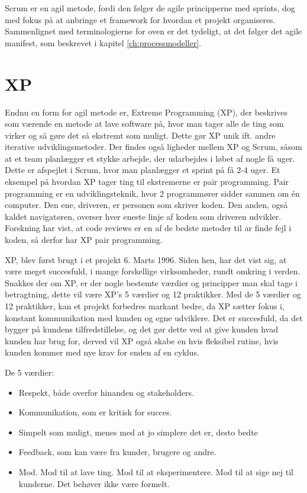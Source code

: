 Scrum er en agil metode, fordi den følger de agile principperne med sprints, dog med fokus på at anbringe et framework for hvordan et projekt organiseres. Sammenlignet med terminologierne for oven er det tydeligt, at det følger det agile manifest, som beskrevet i kapitel \ref{ch:processmodeller}.\cite{Sommerville}  
 

\section{XP}
Endnu en form for agil metode er, Extreme Programming (XP), der beskrives som værende en metode at lave software på, hvor man tager alle de ting som virker og så gøre det så ekstremt som muligt. Dette gør XP unik ift. andre iterative udviklingsmetoder. Der findes også ligheder mellem XP og Scrum, såsom at et team planlægger et stykke arbejde, der udarbejdes i løbet af nogle få uger. Dette er afspejlet i Scrum, hvor man planlægger et sprint på få 2-4 uger. Et eksempel på hvordan XP tager ting til ekstremerne er pair programming. Pair programming er en udviklingsteknik, hvor 2 programmører sidder sammen om én computer. Den ene, driveren, er personen som skriver koden. Den anden, også kaldet navigatøren, overser hver eneste linje af koden som driveren udvikler. Forskning har vist, at code reviews er en af de bedste metoder til ar finde fejl i koden, så derfor har XP pair programming.\cite{WhatisXP}

XP, blev først brugt i et projekt 6. Marts 1996. Siden hen, har det vist sig, at være meget succesfuld, i mange forskellige virksomheder, rundt omkring i verden. Snakkes der om XP, er der nogle bestemte værdier og principper man skal tage i betragtning, dette vil være XP’s 5 værdier og 12 praktikker. Med de 5 værdier og 12 praktikker, kan et projekt forbedres markant bedre, da XP sætter fokus i, konstant kommunikation med kunden og egne udviklere. Det er succesfuld, da det bygger på kundens tilfredstillelse, og det gør dette ved at give kunden hvad kunden har brug for, derved vil XP også skabe en hvis fleksibel rutine, hvis kunden kommer med nye krav for enden af en cyklus. 

De 5 værdier: 

\begin{itemize}
    \item Respekt, både overfor hinanden og stakeholders. 

    \item Kommunikation, som er kritisk for succes. 

    \item Simpelt som muligt, menes med at jo simplere det er, desto bedte 

    \item Feedback, som kan være fra kunder, brugere og andre. 

    \item Mod. Mod til at lave ting. Mod til at eksperimentere. Mod til at sige nej til kunderne. Det behøver ikke være formelt. 
\end{itemize}

